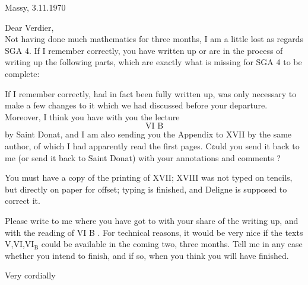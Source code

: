 \begin{flushright}
Massy, 3.11.1970\\
\end{flushright}
Dear Verdier,\\

Not having done much mathematics for three months, I am a little lost as regards SGA 4. If I remember correctly, you have written up or are in the process of writing up the following parts, which are exactly what is missing for SGA 4 to be complete:

If I remember correctly,  had in fact been fully written up,  was only necessary to make a few changes to it which we had discussed before your departure. Moreover, I think you have with you the lecture
\[
\text{VI B}
\]
by Saint Donat, and I am also sending you the Appendix to XVII by the same author, of which I had apparently read the first pages. C\(\mathbb{o}\)uld you send it back to me (or send it back to Saint Donat) with your annotations and comments ?

You must have a copy of the printing of XVII; XVIII was not typed on tencils, but directly on paper for offset;  typing is finished, and Deligne is supposed to correct it.

Please write to me where you have got to with your share of the writing up, and with the reading of VI B .  For technical reasons, it would be very nice if the texts V,VI,\(\mathrm{VI}_{\mathrm{B}}\) could be available in the coming two, three months. Tell me in any case whether you intend to finish, and if so, when you think you will have finished.

Very cordially\\
